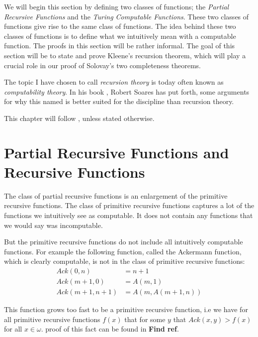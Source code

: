 \documentclass[../main.tex]{subfiles}
\begin{document}
We will begin this section by defining two classes of functions;
the \textit{Partial Recursive Functions} and  the \textit{Turing Computable
Functions}. These two classes of functions give rise to the same class of
functions. The idea behind these two classes of functions is to define what
we intuitively mean with a computable function. The proofs in this section will
be rather informal. The goal of this section will be to state and prove
Kleene's recursion theorem, which will play a crucial role in our proof of 
Solovay's two  completeness theorems.

The topic I have chosen to call \textit{recursion theory} is today often known as
\textit{computability theory}. In his
book \parencite{Soare2016}, Robert Soares has put forth, some arguments for why
this named is better suited for the discipline than recursion theory.

This chapter will follow \parencite{Soare1987}, unless stated otherwise. 

\section{Partial Recursive Functions and Recursive Functions}
The class of partial recursive functions is an enlargement of the primitive recursive
functions. The class of primitive recursive functions captures a lot of the
functions we intuitively see as computable. It does not contain any functions that
we would say was incomputable.

But the primitive recursive functions do not include all intuitively computable
functions. For example the following function, called the Ackermann function,
which is clearly computable, is not
in the class of primitive recursive functions:
\begin{align*}
	Ack(0,n)&=n+1\\
	Ack(m+1,0)&=A(m,1)\\
	Ack(m+1,n+1)&=A(m,A(m+1,n))
\end{align*}

This function grows too fast to be a primitive recursive function, i.e
we have for all primitive recursive functions $f(x)$ that for some $y$ that
$Ack(x,y)>f(x)$ for all $x\in \omega$. 
proof of this fact can be found in \textbf{Find ref}.
\end{document}

